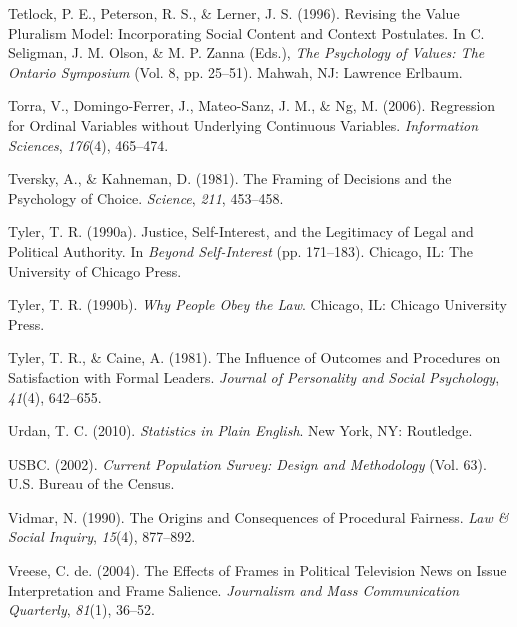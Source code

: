 \documentclass[12pt,econ]{sources/authesis}
\newenvironment{CSLReferences}%
  {}%
  {\par}
\begin{document}
\begin{CSLReferences}{1}{0}
\leavevmode{}%
Tetlock, P. E., Peterson, R. S., \& Lerner, J. S. (1996). {Revising the Value Pluralism Model: Incorporating Social Content and Context Postulates}. In C. Seligman, J. M. Olson, \& M. P. Zanna (Eds.), \emph{{The Psychology of Values: The Ontario Symposium}} (Vol. 8, pp. 25--51). Mahwah, NJ: Lawrence Erlbaum.

\leavevmode{}%
Torra, V., Domingo-Ferrer, J., Mateo-Sanz, J. M., \& Ng, M. (2006). {Regression for Ordinal Variables without Underlying Continuous Variables}. \emph{Information Sciences}, \emph{176}(4), 465--474.

\leavevmode{}%
Tversky, A., \& Kahneman, D. (1981). The {Framing} of {Decisions} and the {Psychology} of {Choice}. \emph{Science}, \emph{211}, 453--458.

\leavevmode{}%
Tyler, T. R. (1990a). Justice, {Self}-{Interest}, and the {Legitimacy} of {Legal} and {Political} {Authority}. In \emph{Beyond {Self}-{Interest}} (pp. 171--183). Chicago, IL: The University of Chicago Press.

\leavevmode{}%
Tyler, T. R. (1990b). \emph{{Why People Obey the Law}}. Chicago, IL: Chicago University Press.

\leavevmode{}%
Tyler, T. R., \& Caine, A. (1981). {The Influence of Outcomes and Procedures on Satisfaction with Formal Leaders}. \emph{Journal of Personality and Social Psychology}, \emph{41}(4), 642--655.

\leavevmode{}%
Urdan, T. C. (2010). \emph{Statistics in {Plain} {English}}. New York, NY: Routledge.

\leavevmode{}%
USBC. (2002). \emph{{Current Population Survey: Design and Methodology}} (Vol. 63). U.S. Bureau of the Census.

\leavevmode{}%
Vidmar, N. (1990). {The Origins and Consequences of Procedural Fairness}. \emph{Law \& Social Inquiry}, \emph{15}(4), 877--892.

\leavevmode{}%
Vreese, C. de. (2004). The {Effects} of {Frames} in {Political} {Television} {News} on {Issue} {Interpretation} and {Frame} {Salience}. \emph{Journalism and Mass Communication Quarterly}, \emph{81}(1), 36--52.


\end{CSLReferences}
\end{document}
